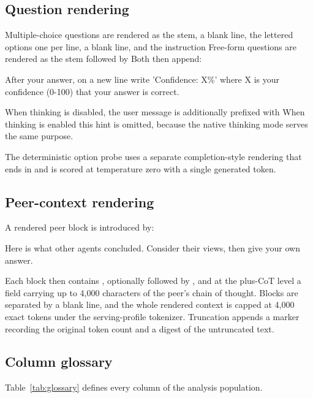 \subsection{Question rendering}

Multiple-choice questions are rendered as the stem, a blank line, the lettered options one
per line, a blank line, and the instruction  Free-form questions are rendered as the stem followed by  Both then append:

\begin{promptquote}
After your answer, on a new line write 'Confidence: X\%' where X is your confidence
(0-100) that your answer is correct.
\end{promptquote}

When thinking is disabled, the user message is additionally prefixed with  When thinking is enabled this
hint is omitted, because the native thinking mode serves the same purpose.

The deterministic option probe uses a separate completion-style rendering that ends in
 and is scored at temperature zero with a single generated token.

\subsection{Peer-context rendering}

A rendered peer block is introduced by:

\begin{promptquote}
Here is what other agents concluded. Consider their views, then give your own answer.
\end{promptquote}

Each block then contains , optionally followed by
, and at the plus-CoT level a  field
carrying up to 4{,}000 characters of the peer's chain of thought. Blocks are separated by a
blank line, and the whole rendered context is capped at 4{,}000 exact tokens under the
serving-profile tokenizer. Truncation appends a marker recording the original token count
and a digest of the untruncated text.

\subsection{Column glossary}

Table~\ref{tab:glossary} defines every column of the analysis population.

